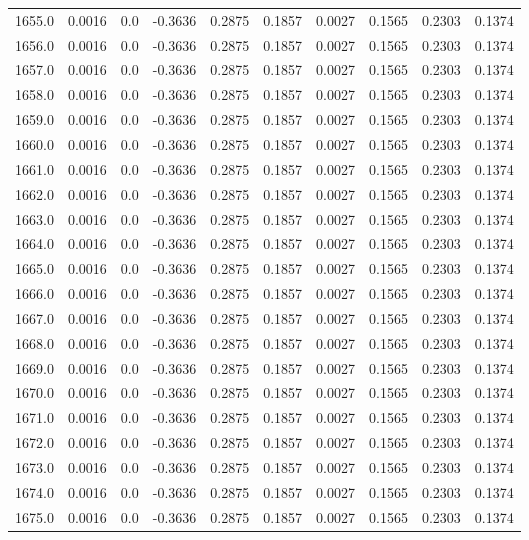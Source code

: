 \begin{longtable}{lrrrrrrrrr}
1655.0 & 0.0016 & 0.0 & -0.3636 & 0.2875 & 0.1857 & 0.0027 & 0.1565 & 0.2303 & 0.1374 \\
1656.0 & 0.0016 & 0.0 & -0.3636 & 0.2875 & 0.1857 & 0.0027 & 0.1565 & 0.2303 & 0.1374 \\
1657.0 & 0.0016 & 0.0 & -0.3636 & 0.2875 & 0.1857 & 0.0027 & 0.1565 & 0.2303 & 0.1374 \\
1658.0 & 0.0016 & 0.0 & -0.3636 & 0.2875 & 0.1857 & 0.0027 & 0.1565 & 0.2303 & 0.1374 \\
1659.0 & 0.0016 & 0.0 & -0.3636 & 0.2875 & 0.1857 & 0.0027 & 0.1565 & 0.2303 & 0.1374 \\
1660.0 & 0.0016 & 0.0 & -0.3636 & 0.2875 & 0.1857 & 0.0027 & 0.1565 & 0.2303 & 0.1374 \\
1661.0 & 0.0016 & 0.0 & -0.3636 & 0.2875 & 0.1857 & 0.0027 & 0.1565 & 0.2303 & 0.1374 \\
1662.0 & 0.0016 & 0.0 & -0.3636 & 0.2875 & 0.1857 & 0.0027 & 0.1565 & 0.2303 & 0.1374 \\
1663.0 & 0.0016 & 0.0 & -0.3636 & 0.2875 & 0.1857 & 0.0027 & 0.1565 & 0.2303 & 0.1374 \\
1664.0 & 0.0016 & 0.0 & -0.3636 & 0.2875 & 0.1857 & 0.0027 & 0.1565 & 0.2303 & 0.1374 \\
1665.0 & 0.0016 & 0.0 & -0.3636 & 0.2875 & 0.1857 & 0.0027 & 0.1565 & 0.2303 & 0.1374 \\
1666.0 & 0.0016 & 0.0 & -0.3636 & 0.2875 & 0.1857 & 0.0027 & 0.1565 & 0.2303 & 0.1374 \\
1667.0 & 0.0016 & 0.0 & -0.3636 & 0.2875 & 0.1857 & 0.0027 & 0.1565 & 0.2303 & 0.1374 \\
1668.0 & 0.0016 & 0.0 & -0.3636 & 0.2875 & 0.1857 & 0.0027 & 0.1565 & 0.2303 & 0.1374 \\
1669.0 & 0.0016 & 0.0 & -0.3636 & 0.2875 & 0.1857 & 0.0027 & 0.1565 & 0.2303 & 0.1374 \\
1670.0 & 0.0016 & 0.0 & -0.3636 & 0.2875 & 0.1857 & 0.0027 & 0.1565 & 0.2303 & 0.1374 \\
1671.0 & 0.0016 & 0.0 & -0.3636 & 0.2875 & 0.1857 & 0.0027 & 0.1565 & 0.2303 & 0.1374 \\
1672.0 & 0.0016 & 0.0 & -0.3636 & 0.2875 & 0.1857 & 0.0027 & 0.1565 & 0.2303 & 0.1374 \\
1673.0 & 0.0016 & 0.0 & -0.3636 & 0.2875 & 0.1857 & 0.0027 & 0.1565 & 0.2303 & 0.1374 \\
1674.0 & 0.0016 & 0.0 & -0.3636 & 0.2875 & 0.1857 & 0.0027 & 0.1565 & 0.2303 & 0.1374 \\
1675.0 & 0.0016 & 0.0 & -0.3636 & 0.2875 & 0.1857 & 0.0027 & 0.1565 & 0.2303 & 0.1374 \\

\end{longtable}
